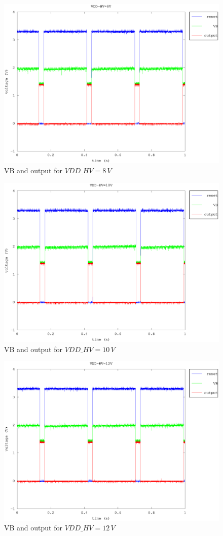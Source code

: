 \documentclass{article}
\begin{document}
\begin{figure}[H]
	\centering
	\includegraphics[width=0.8\linewidth]{fig/VB_8V.eps}
	\caption{VB and output for $VDD\_HV=8\,V$}
	\label{fig:VB_8V}
\end{figure}
\begin{figure}[H]
	\centering
	\includegraphics[width=0.8\linewidth]{fig/VB_10V.eps}
	\caption{VB and output for $VDD\_HV=10\,V$}
	\label{fig:VB_10V}
\end{figure}
\begin{figure}[H]
	\centering
	\includegraphics[width=0.8\linewidth]{fig/VB_12V.eps}
	\caption{VB and output for $VDD\_HV=12\,V$}
	\label{fig:VB_12V}
\end{figure}
\end{document}
